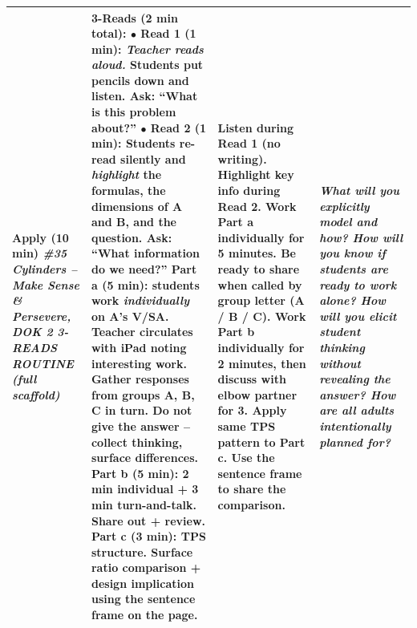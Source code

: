 \documentclass[10pt]{article}
\begin{document}
\begin{xltabular}{\linewidth}{|>{\bfseries\RaggedRight\arraybackslash}p{1.4in}|Y|>{\RaggedRight\arraybackslash}p{1.9in}|>{\itshape\RaggedRight\arraybackslash}p{1.55in}|}
  Apply (10 min) \newline
  \emph{\#35 Cylinders -- Make Sense \& Persevere, DOK 2} \newline
  \emph{3-READS ROUTINE (full scaffold)}
  &
  \textbf{3-Reads (2 min total):} \newline
  $\bullet$ \textbf{Read 1 (1 min):} \emph{Teacher reads aloud.} Students put pencils down and listen. Ask: ``What is this problem about?'' \newline
  $\bullet$ \textbf{Read 2 (1 min):} Students re-read silently and \emph{highlight} the formulas, the dimensions of A and B, and the question. Ask: ``What information do we need?''
  \newline\smallskip
  \textbf{Part a (5 min):} students work \emph{individually} on A's V/SA. Teacher circulates with iPad noting interesting work. Gather responses from groups A, B, C in turn. \textbf{Do not give the answer} -- collect thinking, surface differences.
  \newline\smallskip
  \textbf{Part b (5 min):} 2 min individual + 3 min turn-and-talk. Share out + review.
  \newline\smallskip
  \textbf{Part c (3 min):} TPS structure. Surface ratio comparison + design implication using the sentence frame on the page.
  &
  Listen during Read 1 (no writing).     \newline
  Highlight key info during Read 2.     \newline
  Work Part a individually for 5 minutes.     \newline
  Be ready to share when called by group letter (A / B / C).     \newline
  Work Part b individually for 2 minutes, then discuss with elbow partner for 3.     \newline
  Apply same TPS pattern to Part c.     \newline
  Use the sentence frame to share the comparison.
  &
  What will you explicitly model and how?     \newline
  How will you know if students are ready to work alone?     \newline
  How will you elicit student thinking without revealing the answer?     \newline
  How are all adults intentionally planned for? \\ \hline


\end{xltabular}
\end{document}
